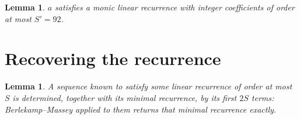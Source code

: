\documentclass[11pt,a4paper]{article}
\theoremstyle{plain}
\newtheorem{lemma}[theorem]{Lemma}
\theoremstyle{definition}
\begin{document}
\begin{lemma}\label{lem:cf}
$a$ satisfies a monic linear recurrence with integer coefficients of order at most
$S'=92$.
\end{lemma}

\section{Recovering the recurrence}

\begin{lemma}\label{lem:bm}
A sequence known to satisfy some linear recurrence of order at most $S$ is determined, together
with its minimal recurrence, by its first $2S$ terms: Berlekamp--Massey applied to them returns
that minimal recurrence exactly.
\end{lemma}
\end{document}
